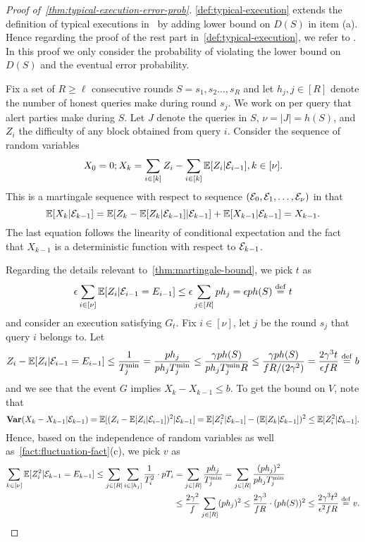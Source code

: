 \begin{proof}[Proof of~\cref{thm:typical-execution-error-prob}]
    \cref{def:typical-execution} extends the definition of typical executions in~\cite{EPRINT:GarKiaLeo20} by adding lower bound on $D(S)$ in item (a).
    Hence regarding the proof of the rest part in~\cref{def:typical-execution}, we refer to \cite{EPRINT:GarKiaLeo20}.
    In this proof we only consider the probability of violating the lower bound on $D(S)$ and the eventual error probability.

    Fix a set of $R \ge \ell$ consecutive rounds $S = s_1, s_2 \ldots, s_R$ and let $h_j, j \in [R]$ denote the number of honest queries make during round $s_j$.
    We work on per query that alert parties make during $S$. Let $J$ denote the queries in $S$, $\nu = |J| = h(S)$, and $Z_i$ the difficulty of any block obtained from query $i$. Consider the sequence of random variables
    \[ X_0 = 0; X_k = \sum_{i \in [k]} Z_i - \sum_{i \in [k]} \mathbb{E} [Z_i | \mathcal{E}_{i - 1}], k \in [\nu]. \]
    This is a martingale sequence with respect to sequence $(\mathcal{E}_0, \mathcal{E}_1, \ldots, \mathcal{E}_\nu)$ in that
    \[ \mathbb{E} [X_k | \mathcal{E}_{k - 1}] = \mathbb{E} [Z_k - \mathbb{E} [Z_k | \mathcal{E}_{k - 1}] | \mathcal{E}_{k - 1}] + \mathbb{E} [X_{k - 1} | \mathcal{E}_{k - 1}] = X_{k - 1}. \]
    The last equation follows the linearity of conditional expectation and the fact that $ X_{k - 1}$ is a deterministic function with respect to $\mathcal{E}_{k - 1}$.

    Regarding the details relevant to~\cref{thm:martingale-bound}, we pick $t$ as
    \[ \epsilon \sum_{i \in [\nu]} \mathbb{E} [Z_i | \mathcal{E}_{i - 1} = E_{i - 1}] \le \epsilon \sum_{j \in [R]} p h_j = \epsilon p h(S) \overset{\mathrm{def}}{=} t \]
    and consider an execution satisfying $G_t$.
    Fix $i \in [\nu]$, let $j$ be the round $s_j$ that query $i$ belongs to.
    Let
    \[ Z_i - \mathbb{E} [Z_i | \mathcal{E}_{i - 1} = E_{i - 1}] \le \frac{1}{T^{\min}_j} = \frac{p h_j}{p h_j T^{\min}_j} \le \frac{\gamma p h(S)}{p h_j T^{\min}_j R} \le \frac{\gamma p h(S)}{fR / (2\gamma^2)} = \frac{2\gamma^3 t}{\epsilon f R} \overset{\mathrm{def}}{=} b \]
    and we see that the event $G$ implies $X_k - X_{k - 1} \le b$.
    To get the bound on $V$, note that
    \[ \mathbf{Var} (X_k - X_{k - 1} | \mathcal{E}_{k - 1}) = \mathbb{E}[(Z_i - \mathbb{E} [Z_i | \mathcal{E}_{i - 1}])^2 | \mathcal{E}_{k - 1}] = \mathbb{E} [Z^2_i | \mathcal{E}_{k  -1}] - (\mathbb{E}[Z_k | \mathcal{E}_{k - 1}])^2 \le \mathbb{E} [Z^2_i | \mathcal{E}_{k  -1}]. \]
    Hence, based on the independence of random variables as well as~\cref{fact:fluctuation-fact}(c), we pick $v$ as
    \begin{align*}
        \sum_{k \in [\nu]} \mathbb{E} [Z^2_i | \mathcal{E}_{k - 1} = E_{k - 1}] \le  \sum_{j \in [R]} \sum_{i \in [h_j]} \frac{1}{T_i^2} \cdot p T_i & =  \sum_{j \in [R]} \frac{p h_j}{T^{\min}_j} =  \sum_{j \in [R]} \frac{(p h_j)^2}{p h_j T^{\min}_j}                                                 \\
                                                                                                                                     & \le \frac{2 \gamma^2}{f} \sum_{j \in [R]} (p h_j)^2 \le \frac{2 \gamma^3}{f R} \cdot (p h(S))^2 \le \frac{2 \gamma^3 t^2}{\epsilon^2 f R} \overset{\mathrm{def}}{=} v.
    \end{align*}


\end{proof}
